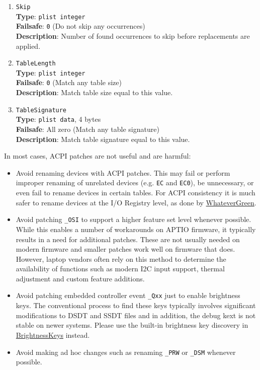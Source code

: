 \documentclass[]{article}
\begin{document}
\begin{enumerate}
\item
  \texttt{Skip}\\
  \textbf{Type}: \texttt{plist\ integer}\\
  \textbf{Failsafe}: \texttt{0} (Do not skip any occurrences)\\
  \textbf{Description}: Number of found occurrences to skip before
  replacements are applied.

\item
  \texttt{TableLength}\\
  \textbf{Type}: \texttt{plist\ integer}\\
  \textbf{Failsafe}: \texttt{0} (Match any table size)\\
  \textbf{Description}: Match table size equal to this value.

\item
  \texttt{TableSignature}\\
  \textbf{Type}: \texttt{plist\ data}, 4 bytes\\
  \textbf{Failsafe}: All zero (Match any table signature)\\
  \textbf{Description}: Match table signature equal to this value.

\end{enumerate}

In most cases, ACPI patches are not useful and are harmful:

\begin{itemize}
\item
  Avoid renaming devices with ACPI patches. This may fail or perform
  improper renaming of unrelated devices (e.g. \texttt{EC} and
  \texttt{EC0}), be unnecessary, or even fail to rename devices in certain tables. For
  ACPI consistency it is much safer to rename devices at the I/O Registry
  level, as done by
  \href{https://github.com/acidanthera/WhateverGreen}{WhateverGreen}.
\item
  Avoid patching \texttt{\_OSI} to support a higher feature set level
  whenever possible. While this enables a number of workarounds on APTIO
  firmware, it typically results in a need for additional patches. These are
  not usually needed on modern firmware and smaller patches work well on
  firmware that does. However, laptop vendors often rely on this method to
  determine the availability of functions such as modern I2C input support, thermal
  adjustment and custom feature additions.
\item
  Avoid patching embedded controller event \texttt{\_Qxx} just to enable
  brightness keys. The conventional process to find these keys typically involves
  significant modifications to DSDT and SSDT files and in addition, the debug kext
  is not stable on newer systems. Please use the built-in brightness key discovery in
  \href{https://github.com/acidanthera/BrightnessKeys}{BrightnessKeys} instead.
\item
  Avoid making ad hoc changes such as renaming \texttt{\_PRW} or \texttt{\_DSM}
  whenever possible.
\end{itemize}
\end{document}
